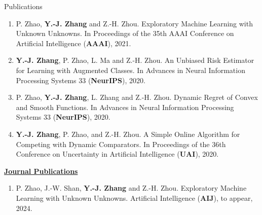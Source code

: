 \documentclass{resume} %
\begin{document}
\begin{rSection}{Publications}
\begin{enumerate}[leftmargin=*]
	\item P. Zhao, \textbf{Y.-J. Zhang} and Z.-H. Zhou. Exploratory Machine Learning with Unknown Unknowns. In {Proceedings of the 35th AAAI Conference on Artificial Intelligence} (\textbf{AAAI}), 2021.
	\item \textbf{Y.-J. Zhang}, P. Zhao, L. Ma and Z.-H. Zhou. An Unbiased Risk Estimator for Learning with Augmented Classes. In {Advances in Neural Information Processing Systems 33} (\textbf{NeurIPS}), 2020.
	\item P. Zhao, \textbf{Y.-J. Zhang}, L. Zhang and Z.-H. Zhou. Dynamic Regret of Convex and Smooth Functions. In {Advances in Neural Information Processing Systems 33} (\textbf{NeurIPS}), 2020.
	\item \textbf{Y.-J. Zhang}, P. Zhao, and Z.-H. Zhou. A Simple Online Algorithm for Competing with Dynamic Comparators. In {Proceedings of the 36th Conference on Uncertainty in Artificial Intelligence} (\textbf{UAI}), 2020.
\end{enumerate}
\noindent \underline{\textbf{Journal Publications}}
\begin{enumerate}[leftmargin=*]
	\item P. Zhao, J.-W. Shan, \textbf{Y.-J. Zhang} and Z.-H. Zhou. Exploratory Machine Learning with Unknown Unknowns. Artificial Intelligence (\textbf{AIJ}), to appear, 2024.
\end{enumerate}
\end{rSection}




\end{document}
